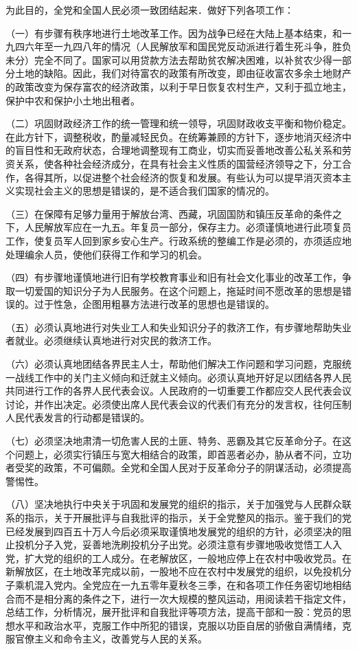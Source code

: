 为此目的，全党和全国人民必须一致团结起来．做好下列各项工作：

（一）有步骤有秩序地进行土地改革工作。因为战争已经在大陆上基本结束，和一九四六年至一九四八年的情况（人民解放军和国民党反动派进行着生死斗争，胜负未分）完全不同了。国家可以用贷款方法去帮助贫农解决困难，以补贫农少得一部分土地的缺陷。因此，我们对待富农的政策有所改变，即由征收富农多余土地财产的政策改变为保存富农的经济政策，以利于早日恢复农村生产，又利于孤立地主，保护中农和保护小土地出租者。

（二）巩固财政经济工作的统一管理和统一领导，巩固财政收支平衡和物价稳定。在此方针下，调整税收，酌量减轻民负。在统筹兼顾的方针下，逐步地消灭经济中的盲目性和无政府状态，合理地调整现有工商业，切实而妥善地改善公私关系和劳资关系，使各种社会经济成分，在具有社会主义性质的国营经济领导之下，分工合作，各得其所，以促进整个社会经济的恢复和发展。有些认为可以提早消灭资本主义实现社会主义的思想是错误的，是不适合我们国家的情况的。

（三）在保障有足够力量用于解放台湾、西藏，巩固国防和镇压反革命的条件之下，人民解放军应在一九五。年复员一部分，保存主力。必须谨慎地进行此项复员工作，使复员军人回到家乡安心生产。行政系统的整编工作是必须的，亦须适应地处理编余人员，使他们获得工作和学习的机会。

（四）有步骤地谨慎地进行旧有学校教育事业和旧有社会文化事业的改革工作，争取一切爱国的知识分子为人民服务。在这个问题上，拖延时间不愿改革的思想是错误的。过于性急，企图用粗暴方法进行改革的思想也是错误的。

（五）必须认真地进行对失业工人和失业知识分子的救济工作，有步骤地帮助失业者就业。必须继续认真地进行对灾民的救济工作。

（六）必须认真地团结各界民主人士，帮助他们解决工作问题和学习问题，克服统一战线工作中的关门主义倾向和迁就主义倾向。必须认真地开好足以团结各界人民共同进行工作的各界人民代表会议。人民政府的一切重要工作都应交人民代表会议讨论，并作出决定。必须使出席人民代表会议的代表们有充分的发言权，往何压制人民代表发言的行动都是错误的。

（七）必须坚决地肃清一切危害人民的土匪、特务、恶霸及其它反革命分子。在这个问题上，必须实行镇压与宽大相结合的政策，即首恶者必办，胁从者不问，立功者受奖的政策，不可偏颇。全党和全国人民对于反革命分子的阴谋活动，必须提高警惕性。

（八）坚决地执行中央关于巩固和发展党的组织的指示，关于加强党与人民群众联系的指示，关于开展批评与自我批评的指示，关于全党整风的指示。鉴于我们的党已经发展到四百五十万人今后必须采取谨慎地发展党的组织的方针，必须坚决的阻止投机分子入党，妥善地洗刷投机分子出党。必须注意有步骤地吸收觉悟工人入党，扩大党的组织的工人成分。在老解放区，一般地应停上在农村中吸收党员。在新解放区，在土地改革完成以前，一股地不应在农村中发展党的组织，以免投机分子乘机混入党内。全党应在一九五零年夏秋冬三季，在和各项工作任务密切地相结合而不是相分离的条件之下，进行一次大规模的整风运动，用阅读若干指定文件，总结工作，分析情况，展开批评和自我批评等项方法，提高干部和一股：党员的思想水平和政治水平，克服工作中所犯的错误，克服以功臣自居的骄傲自满情绪，克服官僚主义和命令主义，改善党与人民的关系。


